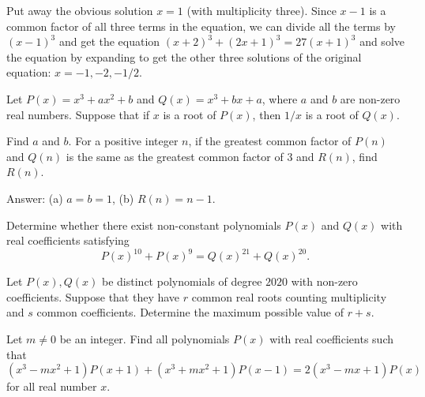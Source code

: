 \documentclass[12pt,a4paper]{memoir}
\theoremstyle{definition}
\begin{document}
\begin{solution}[name=Solution by CRMO 2002]
	Put away the obvious solution $x=1$ (with multiplicity three). Since $x-1$ is a common factor of all three terms in the equation, we can divide all the terms by $(x-1)^3$ and get the equation $(x+2)^3 + (2x+1)^3 = 27(x+1)^3$ and solve the equation by expanding to get the other three solutions of the original equation: $x=-1, -2, -1/2$.
\end{solution}



\begin{question}
	Let $P(x)=x^3+ax^2+b$ and $Q(x)=x^3+bx+a$, where $a$ and $b$ are non-zero real numbers. Suppose that if $x$ is a root of $P(x)$, then $1/x$ is a root of $Q(x)$.
	\begin{tasks}
		\task Find $a$ and $b$.
		\task For a positive integer $n$, if the greatest common factor of $P(n)$ and $Q(n)$ is the same as the greatest common factor of $3$ and $R(n)$, find $R(n)$. 
	\end{tasks}
\end{question}


\begin{solution}[name=Solution Inspired by RMO 2013]
	Answer: (a) $a=b=1$, (b) $R(n)=n-1$.
\end{solution}

\begin{question}[name={2018 Romanian Masters in Mathematics}]
	Determine whether there exist non-constant polynomials $P(x)$ and $Q(x)$ with real coefficients satisfying $$P(x)^{10}+P(x)^9 = Q(x)^{21}+Q(x)^{20}.$$
\end{question}


\begin{question}[name={2020 Balkan TST}]
	Let $P(x), Q(x)$ be distinct polynomials of degree $2020$ with non-zero coefficients. Suppose that they have $r$ common real roots counting multiplicity and $s$ common coefficients. Determine the maximum possible value of $r + s$.
\end{question}


\begin{question}[name={2013 IMO Shortlist}]
	Let $m \neq 0 $ be an integer. Find all polynomials $P(x) $ with real coefficients such that
	\[ (x^3 - mx^2 +1 ) P(x+1)  + (x^3+mx^2+1) P(x-1) =2(x^3 - mx +1 ) P(x) \]
	for all real number $x$.
\end{question}
\end{document}
